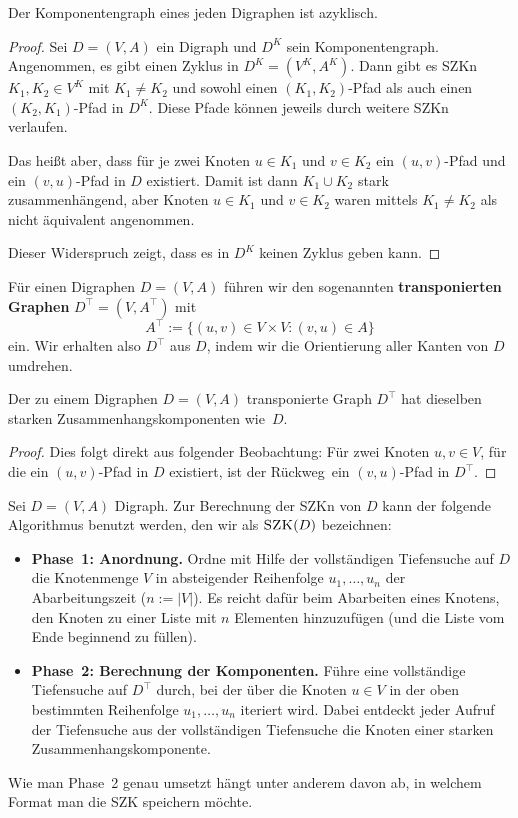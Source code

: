 \begin{prop}
	Der Komponentengraph eines jeden Digraphen ist azyklisch. 
\end{prop}
\begin{proof}
Sei $D=(V,A)$ ein Digraph und $D^K$ sein Komponentengraph.
Angenommen, es gibt einen Zyklus in $D^K=(V^K,A^K)$.
Dann gibt es SZKn $K_1,K_2 \in V^K$ mit $K_1 \neq K_2$ und sowohl einen $(K_1,K_2)$-Pfad als auch einen $(K_2,K_1)$-Pfad in $D^K$.
Diese Pfade können jeweils durch weitere SZKn verlaufen.

Das heißt aber, dass für je zwei Knoten $u \in K_1$ und $v \in K_2$ ein $(u,v)$-Pfad und ein $(v,u)$-Pfad in $D$ existiert.
Damit ist dann $K_1 \cup K_2$ stark zusammenhängend, aber Knoten $u \in K_1$ und $v \in K_2$ waren mittels $K_1 \neq K_2$ als nicht äquivalent angenommen.

Dieser Widerspruch zeigt, dass es in $D^K$ keinen Zyklus geben kann.
\end{proof}


\begin{defn}
	Für einen Digraphen $D = (V,A)$ führen wir den sogenannten
 \textbf{transponierten Graphen} $D^\top = (V,A^\top)$ mit
 \[
 A^\top := \{(u,v) \in V \times V : (v,u) \in A\}
 \]
 ein. 
Wir erhalten also $D^\top$ aus $D$, indem wir die Orientierung aller Kanten von $D$ umdrehen.
\end{defn} 


\begin{prop}
\label{beob:d-vs-dt}
Der zu einem Digraphen $D=(V,A)$ transponierte Graph $D^\top$ hat dieselben starken Zusammenhangskomponenten wie~$D$.
\end{prop}
\begin{proof}
Dies folgt direkt aus folgender Beobachtung: Für zwei Knoten $u,v \in V$, für die ein $(u,v)$-Pfad in $D$ existiert, ist der \glqq Rückweg\grqq\ ein $(v,u)$-Pfad in $D^\top$.
\end{proof}

\begin{bem}  \label{szk:algo}
	Sei $D = (V,A)$ Digraph. Zur Berechnung der SZKn von $D$ kann der folgende Algorithmus benutzt werden, den wir als $\mathop{\text{\textsc{SZK}}}(D)$ bezeichnen: 
\begin{itemize}
	\item \textbf{Phase~1: Anordnung.} Ordne mit Hilfe der vollständigen Tiefensuche auf $D$ die Knotenmenge $V$ in absteigender Reihenfolge $u_1,\ldots,u_n$ der Abarbeitungszeit ($n:=|V|$). Es reicht dafür beim Abarbeiten eines Knotens, den Knoten zu einer Liste mit $n$ Elementen hinzuzufügen (und die Liste vom Ende beginnend zu füllen). 
	\item \textbf{Phase~2: Berechnung der Komponenten.} Führe eine vollständige Tiefensuche auf $D^\top$ durch, bei der über die Knoten $u \in V$ in der oben bestimmten Reihenfolge $u_1,\ldots,u_n$ iteriert wird. Dabei entdeckt jeder Aufruf der Tiefensuche aus der vollständigen Tiefensuche die Knoten einer starken Zusammenhangskomponente.
\end{itemize} 

\noindent Wie man Phase~2 genau umsetzt hängt unter anderem davon ab, in welchem Format man die SZK speichern möchte. 
\end{bem} 

